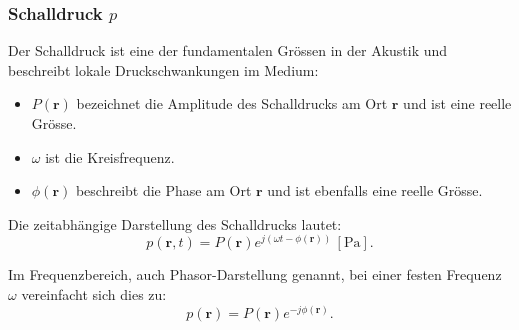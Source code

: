 \subsubsection{Schalldruck $p$}
% 
Der Schalldruck ist eine der fundamentalen Grössen in der Akustik und beschreibt lokale Druckschwankungen im Medium:
 
\begin{itemize}
\item $P  (\boldsymbol{r})$ bezeichnet die Amplitude des Schalldrucks am Ort $\boldsymbol{r}$ und ist eine reelle Grösse.
%
\item $\omega$ ist die Kreisfrequenz.
%
\item $\phi  (\boldsymbol{r})$ beschreibt die Phase am Ort $\boldsymbol{r}$ und ist ebenfalls eine reelle Grösse.
\end{itemize}
 
Die zeitabhängige Darstellung des Schalldrucks lautet:
\begin{equation*}
p(\boldsymbol{r},t)
=
P(\boldsymbol{r})  e^{j( \omega t - \phi(\boldsymbol{r}))}\, [\si{\pascal}].
\end{equation*}
 
Im Frequenzbereich, auch Phasor-Darstellung genannt, bei einer festen
Frequenz $\omega$ vereinfacht sich dies zu:
\begin{equation*}
p(\boldsymbol{r}) = P(\boldsymbol{r})  e^{-j \phi (\boldsymbol{r})}.
\label{helmholtz:PhasorSchalldruck}
\end{equation*}
 

